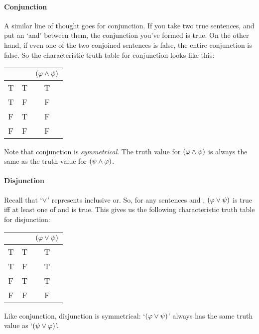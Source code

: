 \paragraph{Conjunction} A similar line of thought goes for conjunction.  If you take two true sentences, and put an `and' between them, the conjunction you've formed is true.  On the other hand, if even one of the two conjoined sentences is false, the entire conjunction is false.    So the {characteristic truth table} for conjunction looks like this:
\begin{center}
\begin{tabular}{c c |c}
\meta{\varphi} & \meta{\psi} & $(\mathcal{\varphi}\wedge\mathcal{\psi})$\\
\hline
T & T & T\\
T & F & F\\
F & T & F\\
F & F & F
\end{tabular}
\end{center}
Note that conjunction is \emph{symmetrical}. The truth value for $(\mathcal{\varphi} \wedge \mathcal{\psi})$ is always the same as the truth value for $(\mathcal{\psi} \wedge \mathcal{\varphi})$.



\paragraph{Disjunction} Recall that `$\vee$' represents inclusive or. So, for any sentences \meta{\varphi} and \meta{\psi}, $(\mathcal{\varphi}\vee \mathcal{\psi})$ is true iff at least one of \meta{\varphi} and \meta{\psi} is true. This gives us the following characteristic truth table for disjunction:
\begin{center}
\begin{tabular}{c c|c}
\meta{\varphi} & \meta{\psi} & $(\mathcal{\varphi}\vee\mathcal{\psi})$ \\
\hline
T & T & T\\
T & F & T\\
F & T & T\\
F & F & F
\end{tabular}
\end{center}
Like conjunction, disjunction is symmetrical: `$(\mathcal{\varphi} \vee \mathcal{\psi})$' always has the same truth value as `$(\mathcal{\psi} \vee \mathcal{\varphi})$'.

